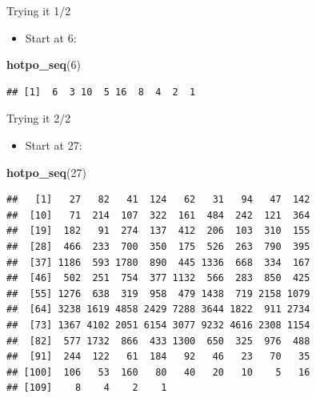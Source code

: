 \documentclass[ignorenonframetext,]{beamer}
\newenvironment{Shaded}{\begin{snugshade}}{\end{snugshade}}
\newcommand{\DecValTok}[1]{\textcolor[rgb]{0.00,0.00,0.81}{#1}}
\newcommand{\KeywordTok}[1]{\textcolor[rgb]{0.13,0.29,0.53}{\textbf{#1}}}
\newcommand{\NormalTok}[1]{#1}
\providecommand{\tightlist}{%
  \setlength{\itemsep}{0pt}\setlength{\parskip}{0pt}}
\begin{document}
\begin{frame}[fragile]{Trying it 1/2}
\protect\hypertarget{trying-it-12}{}

\begin{itemize}
\tightlist
\item
  Start at 6:
\end{itemize}

\begin{Shaded}
\begin{Highlighting}[]
\KeywordTok{hotpo_seq}\NormalTok{(}\DecValTok{6}\NormalTok{)}
\end{Highlighting}
\end{Shaded}

\begin{verbatim}
## [1]  6  3 10  5 16  8  4  2  1
\end{verbatim}

\end{frame}

\begin{frame}[fragile]{Trying it 2/2}
\protect\hypertarget{trying-it-22}{}

\begin{itemize}
\tightlist
\item
  Start at 27:
\end{itemize}

\begin{Shaded}
\begin{Highlighting}[]
\KeywordTok{hotpo_seq}\NormalTok{(}\DecValTok{27}\NormalTok{)}
\end{Highlighting}
\end{Shaded}

\begin{verbatim}
##   [1]   27   82   41  124   62   31   94   47  142
##  [10]   71  214  107  322  161  484  242  121  364
##  [19]  182   91  274  137  412  206  103  310  155
##  [28]  466  233  700  350  175  526  263  790  395
##  [37] 1186  593 1780  890  445 1336  668  334  167
##  [46]  502  251  754  377 1132  566  283  850  425
##  [55] 1276  638  319  958  479 1438  719 2158 1079
##  [64] 3238 1619 4858 2429 7288 3644 1822  911 2734
##  [73] 1367 4102 2051 6154 3077 9232 4616 2308 1154
##  [82]  577 1732  866  433 1300  650  325  976  488
##  [91]  244  122   61  184   92   46   23   70   35
## [100]  106   53  160   80   40   20   10    5   16
## [109]    8    4    2    1
\end{verbatim}

\end{frame}
\end{document}
